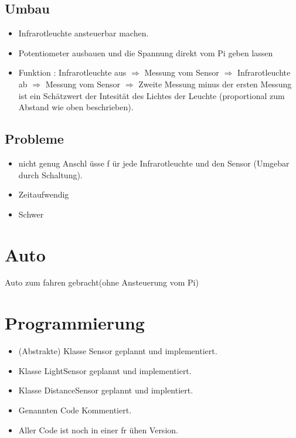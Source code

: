 \documentclass{article}
\begin{document}
\subsection{Umbau}

\begin{itemize}

\item Infrarotleuchte ansteuerbar machen.

\item Potentiometer ausbauen und die Spannung direkt vom Pi geben lassen 

\item Funktion : Infrarotleuchte aus $\Rightarrow$ Messung vom Sensor $\Rightarrow$ Infrarotleuchte ab $\Rightarrow$ Messung vom Sensor $\Rightarrow$ Zweite Messung minus der ersten Messung ist ein Sch\"{a}tzwert der Intesit\"{a}t des Lichtes der Leuchte (proportional zum Abstand wie oben beschrieben).

\end{itemize}

\subsection{Probleme}

\begin{itemize}

\item nicht genug Anschl
\"{u}sse f
\"{u}r jede Infrarotleuchte und den Sensor (Umgebar durch Schaltung).

\item Zeitaufwendig 

\item Schwer

\end{itemize}

\section{Auto}

Auto zum fahren gebracht(ohne Ansteuerung vom Pi)

\section{Programmierung}

\begin{itemize}

\item (Abstrakte) Klasse Sensor geplannt und implementiert.

\item Klasse LightSensor geplannt und implementiert.

\item Klasse DistanceSensor geplannt und implentiert.

\item Genannten Code Kommentiert.

\item Aller Code ist noch in einer fr
\"{u}hen Version.

\end{itemize}
\end{document}
